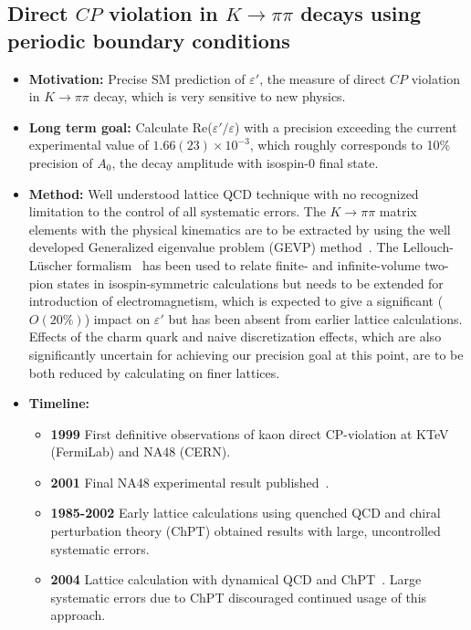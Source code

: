 \documentclass[12pt,hyperpdf]{article}
\begin{document}
\subsection{Direct $CP$ violation in $K\to\pi\pi$ decays using periodic boundary conditions}
\begin{itemize}
    \item{\bf Motivation:} Precise SM prediction of $\varepsilon'$, the measure of direct $CP$ violation in $K\to\pi\pi$ decay, which is very sensitive to new physics. 
    \item{\bf Long term goal:} Calculate Re($\varepsilon'/\varepsilon$) with
      a precision exceeding the current experimental value of $1.66(23)\times10^{-3}$, which roughly corresponds to 10\% precision of $A_0$, the decay amplitude with isospin-0 final state.
    \item{\bf Method:} Well understood lattice QCD technique with no
      recognized limitation to the control of all systematic
      errors. The $K\to\pi\pi$ matrix elements with the physical kinematics are to be
      extracted by using the well developed Generalized eigenvalue problem (GEVP)
      method~\cite{Luscher:1990ck,Bulava:2011yz}.  The Lellouch-L\"uscher
      formalism~\cite{Lellouch:2000pv} has been used to relate finite- and
      infinite-volume two-pion states in isospin-symmetric calculations but
      needs to be extended for introduction of electromagnetism, which is
      expected to give a significant ($O(20\%)$) impact on $\varepsilon'$
      but has been absent from earlier lattice calculations.  Effects of the
      charm quark and naive discretization effects, which are also significantly
      uncertain for achieving our precision goal at this point, are to be both
      reduced by calculating on finer lattices.
\item{\bf Timeline:}
\begin{itemize}
    \item{\bf 1999} First definitive observations of kaon direct CP-violation at KTeV (FermiLab) and NA48 (CERN).
    \item{\bf 2001} Final NA48 experimental result published~\cite{NA48:2001bct}.
    \item{\bf 1985-2002} Early lattice calculations using quenched QCD and chiral perturbation theory (ChPT) obtained results with large, uncontrolled systematic errors.
    \item{\bf 2004} Lattice calculation with dynamical QCD and ChPT~\cite{Li:2008kc}. Large systematic errors due to ChPT discouraged continued usage of this approach.

\end{itemize}
\end{itemize}
\end{document}
